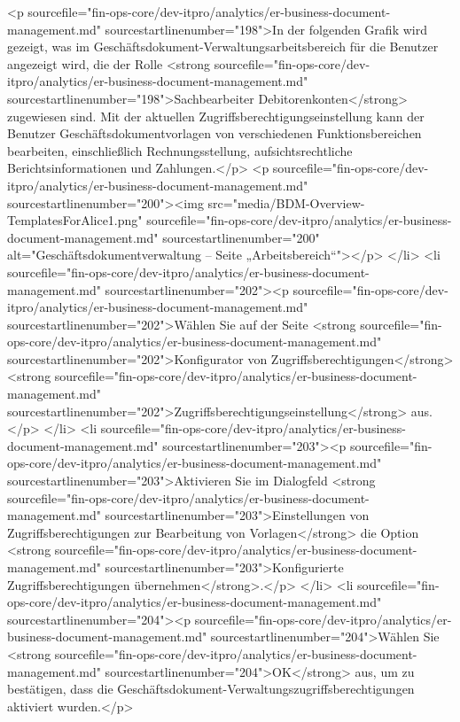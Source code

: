 <p sourcefile="fin-ops-core/dev-itpro/analytics/er-business-document-management.md" sourcestartlinenumber="198">In der folgenden Grafik wird gezeigt, was im Geschäftsdokument-Verwaltungsarbeitsbereich für die Benutzer angezeigt wird, die der Rolle <strong sourcefile="fin-ops-core/dev-itpro/analytics/er-business-document-management.md" sourcestartlinenumber="198">Sachbearbeiter Debitorenkonten</strong> zugewiesen sind. Mit der aktuellen Zugriffsberechtigungseinstellung kann der Benutzer Geschäftsdokumentvorlagen von verschiedenen Funktionsbereichen bearbeiten, einschließlich Rechnungsstellung, aufsichtsrechtliche Berichtsinformationen und Zahlungen.</p>
<p sourcefile="fin-ops-core/dev-itpro/analytics/er-business-document-management.md" sourcestartlinenumber="200"><img src="media/BDM-Overview-TemplatesForAlice1.png" sourcefile="fin-ops-core/dev-itpro/analytics/er-business-document-management.md" sourcestartlinenumber="200" alt="Geschäftsdokumentverwaltung – Seite „Arbeitsbereich“"></p>
</li>
<li sourcefile="fin-ops-core/dev-itpro/analytics/er-business-document-management.md" sourcestartlinenumber="202"><p sourcefile="fin-ops-core/dev-itpro/analytics/er-business-document-management.md" sourcestartlinenumber="202">Wählen Sie auf der Seite <strong sourcefile="fin-ops-core/dev-itpro/analytics/er-business-document-management.md" sourcestartlinenumber="202">Konfigurator von Zugriffsberechtigungen</strong> <strong sourcefile="fin-ops-core/dev-itpro/analytics/er-business-document-management.md" sourcestartlinenumber="202">Zugriffsberechtigungseinstellung</strong> aus.</p>
</li>
<li sourcefile="fin-ops-core/dev-itpro/analytics/er-business-document-management.md" sourcestartlinenumber="203"><p sourcefile="fin-ops-core/dev-itpro/analytics/er-business-document-management.md" sourcestartlinenumber="203">Aktivieren Sie im Dialogfeld <strong sourcefile="fin-ops-core/dev-itpro/analytics/er-business-document-management.md" sourcestartlinenumber="203">Einstellungen von Zugriffsberechtigungen zur Bearbeitung von Vorlagen</strong> die Option <strong sourcefile="fin-ops-core/dev-itpro/analytics/er-business-document-management.md" sourcestartlinenumber="203">Konfigurierte Zugriffsberechtigungen übernehmen</strong>.</p>
</li>
<li sourcefile="fin-ops-core/dev-itpro/analytics/er-business-document-management.md" sourcestartlinenumber="204"><p sourcefile="fin-ops-core/dev-itpro/analytics/er-business-document-management.md" sourcestartlinenumber="204">Wählen Sie <strong sourcefile="fin-ops-core/dev-itpro/analytics/er-business-document-management.md" sourcestartlinenumber="204">OK</strong> aus, um zu bestätigen, dass die Geschäftsdokument-Verwaltungszugriffsberechtigungen aktiviert wurden.</p>
